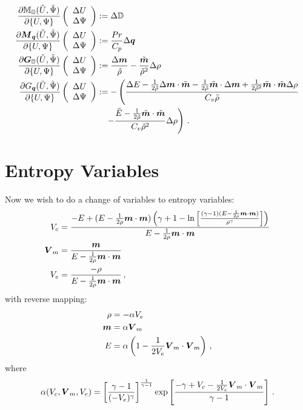 \documentclass[Dissertation.tex]{subfiles}
\begin{document}
\begin{align*}
\frac{\partial\mathbb{M}_{\mathbb{D}}(\tilde U,\tilde\Psi)}{\partial\{U,\Psi\}}\left( \begin{array}{c} \Delta U\\ \Delta\Psi\\ \end{array} \right)&:=
	\Delta\mathbb{D}\\
\frac{\partial\boldsymbol M_{\boldsymbol q}(\tilde U,\tilde\Psi)}{\partial\{U,\Psi\}}\left( \begin{array}{c} \Delta U\\ \Delta\Psi\\ \end{array} \right)&:=
	\frac{Pr}{C_p}\Delta\boldsymbol q\\
\frac{\partial\boldsymbol G_{\mathbb{D}}(\tilde U,\tilde\Psi)}{\partial\{U,\Psi\}}\left( \begin{array}{c} \Delta U\\ \Delta\Psi\\ \end{array} \right)&:=
	\frac{\Delta\boldsymbol m}{\tilde\rho}-\frac{\tilde{\boldsymbol m}}{\tilde\rho^2}\Delta\rho\\
\frac{\partial G_{\boldsymbol q}(\tilde U,\tilde\Psi)}{\partial\{U,\Psi\}}\left( \begin{array}{c} \Delta U\\ \Delta\Psi\\ \end{array} \right)&:=
	-\left(\frac{\Delta E-\frac{1}{2\tilde\rho}\Delta\boldsymbol m\cdot\tilde{\boldsymbol m}
	-\frac{1}{2\tilde\rho}\tilde{\boldsymbol m}\cdot\Delta\boldsymbol m
	+\frac{1}{2\tilde\rho^2}\tilde{\boldsymbol m}\cdot\tilde{\boldsymbol m}\Delta\rho}{C_v\tilde\rho}
	\right.\\&\quad\left.
	-\frac{\tilde E-\frac{1}{2\tilde\rho}\tilde{\boldsymbol m}\cdot\tilde{\boldsymbol m}}{C_v\tilde\rho^2}\Delta\rho\right)
\,.
\end{align*}

\section{Entropy Variables}
Now we wish to do a change of variables to entropy variables:
\begin{align*}
V_c&=\frac{-E+(E-\frac{1}{2\rho}\boldsymbol m\cdot\boldsymbol m)\left( \gamma+1-\ln\left[ \frac{(\gamma-1)(E-\frac{1}{2\rho}\boldsymbol m\cdot\boldsymbol m)}{\rho^\gamma} \right] \right)}
{E-\frac{1}{2\rho}\boldsymbol m\cdot\boldsymbol m}\\
\boldsymbol V_m&=\frac{\boldsymbol m}{E-\frac{1}{2\rho}\boldsymbol m\cdot\boldsymbol m}\\
V_e&=\frac{-\rho}{E-\frac{1}{2\rho}\boldsymbol m\cdot\boldsymbol m}\,,
\end{align*}
with reverse mapping:
\begin{align*}
\rho&=-\alpha V_e\\
\boldsymbol m&=\alpha\boldsymbol V_m\\
E&=\alpha\left( 1-\frac{1}{2V_e}\boldsymbol V_m\cdot\boldsymbol V_m \right)\,,
\end{align*}
where 
\[
\alpha(V_c,\boldsymbol V_m,V_e)=\left[ \frac{\gamma-1}{(-V_e)^\gamma} \right]^{\frac{1}{\gamma-1}}\exp\left[ \frac{-\gamma+V_c-\frac{1}{2V_e}\boldsymbol V_m\cdot\boldsymbol V_m}{\gamma-1} \right]\,.
\]
\end{document}
